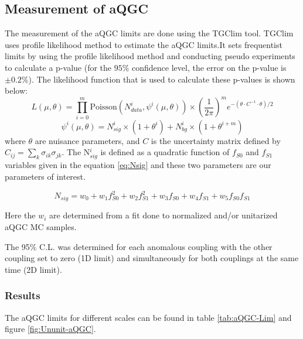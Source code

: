 \subsection{Measurement of aQGC}

The measurement of the aQGC limits are done using the TGClim tool. TGClim uses profile likelihood method to estimate the aQGC limits.It sets frequentist limits by using the profile likelihood method and conducting pseudo experiments to 
calculate a p-value (for the $95\%$ confidence level, the error on the p-value is $\pm0.2\%$). 
The likelihood function that is used to calculate these p-values is shown below:
\begin{equation}
 L(\mu,\theta) = \prod_{i=0}^m \text{Poisson}(N_{data}^i,\psi^i(\mu,\theta)) \times \left( \frac{1}{2\pi} \right)^m e^{-( \theta \cdot C^{-1} \cdot \theta)/2}
 \label{eq:likelihood}
\end{equation}
\begin{equation}
 \psi^i(\mu,\theta) = N^i_{sig}\times(1+\theta^i) + N^i_{bg} \times(1+\theta^{i+m})
\end{equation}
 where $\theta$ are nuisance parameters, and $C$ is 
the uncertainty matrix defined by $C_{ij} = \sum_k \sigma_{ik} \sigma_{jk}$.
The N$^i_{sig}$ is defined as a quadratic function of $f_{S0}$ and $f_{S1}$ variables given in the equation \ref{eq:Nsig} and these two parameters are our parameters of interest. 

\begin{equation}
  N_{sig} = w_0 + w_1f_{S0}^2+w_2f_{S1}^2+w_3f_{S0}+w_4f_{S1}+w_5f_{S0}f_{S1}
  \label{eq:Nsig}
\end{equation}

Here the $w_i$ are determined from a fit done to normalized and/or unitarized aQGC MC samples. 

The 95\% C.L. was determined for each anomalous coupling with the other coupling set to zero (1D limit) and simultaneously for both couplings at the same time (2D limit).

\subsubsection{Results}
The aQGC limits for different scales can be found  in table \ref{tab:aQGC-Lim} and figure \ref{fig:Ununit-aQGC}.

